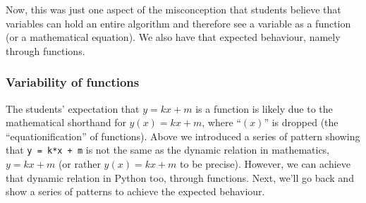 Now, this was just one aspect of the misconception that students believe that 
variables can hold an entire algorithm and therefore see a variable as a 
function (or a mathematical equation).
We also have that expected behaviour, namely through functions.

\subsubsection{Variability of functions}

The students' expectation that \(y = kx + m\) is a function 
\parencite{Kohn2017VariableEvaluation,Plass2015Variables,Doukakis2007} is 
likely due to the mathematical shorthand for \(y(x) = kx + m\), where 
\enquote{\((x)\)} is dropped (the \enquote{equationification} of functions).
Above we introduced a series of pattern showing that
\texttt{y = k*x + m}
is not the same as the dynamic relation in mathematics,
\(y = kx + m\) (or rather \(y(x) = kx + m\) to be precise).
However, we can achieve that dynamic relation in Python too, through functions.
Next, we'll go back and show a series of patterns to achieve the expected 
behaviour.

